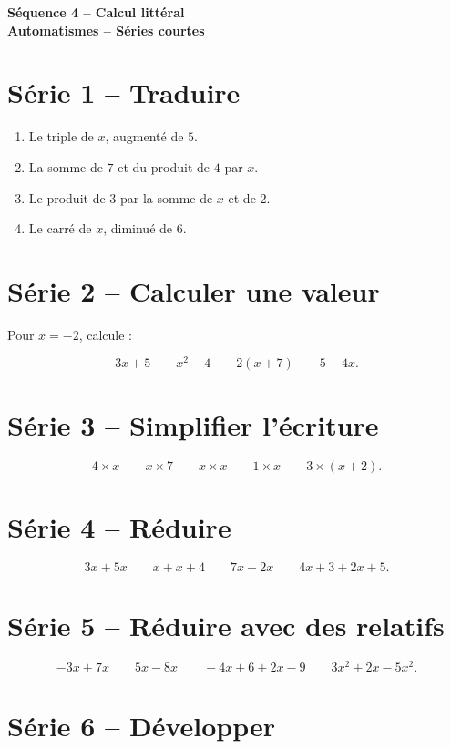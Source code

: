 \documentclass[12pt,a4paper]{article}
\newcommand{\titreseq}[1]{%
\begin{center}
{\sffamily\LARGE\bfseries\color{TitreC}Séquence 4 -- Calcul littéral}\\[0.2em]
{\sffamily\large\bfseries\color{SavoirC}#1}
\end{center}}
\begin{document}
\titreseq{Automatismes -- Séries courtes}


\section*{Série 1 -- Traduire}

\begin{enumerate}
  \item Le triple de \(x\), augmenté de \(5\).
  \item La somme de \(7\) et du produit de \(4\) par \(x\).
  \item Le produit de \(3\) par la somme de \(x\) et de \(2\).
  \item Le carré de \(x\), diminué de \(6\).
\end{enumerate}

\section*{Série 2 -- Calculer une valeur}

Pour \(x=-2\), calcule :

\[
3x+5 \qquad x^2-4 \qquad 2(x+7) \qquad 5-4x.
\]

\section*{Série 3 -- Simplifier l'écriture}

\[
4\times x \qquad x\times7 \qquad x\times x
\qquad 1\times x \qquad 3\times(x+2).
\]

\section*{Série 4 -- Réduire}

\[
3x+5x \qquad x+x+4 \qquad 7x-2x
\qquad 4x+3+2x+5.
\]

\section*{Série 5 -- Réduire avec des relatifs}

\[
-3x+7x \qquad 5x-8x \qquad -4x+6+2x-9
\qquad 3x^2+2x-5x^2.
\]

\section*{Série 6 -- Développer}
\end{document}
